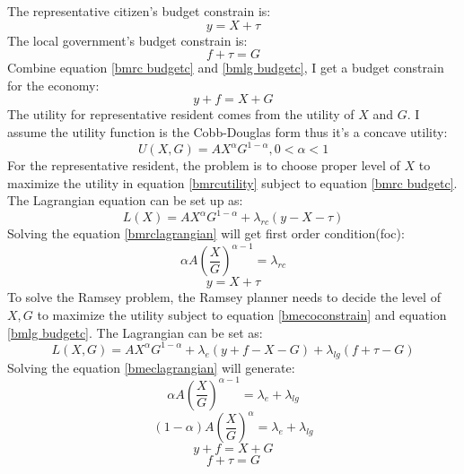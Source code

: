 The representative citizen's budget constrain is:
\begin{equation}
    y=X+\tau \label{bmrc budgetc}
\end{equation}
The local government's budget constrain is:
\begin{equation}
    f+\tau=G \label{bmlg budgetc}
\end{equation}
Combine equation \ref{bmrc budgetc} and \ref{bmlg budgetc}, I get a budget constrain for the economy:
\begin{equation}
    y+f=X+G \label{bmecoconstrain}
\end{equation}
The utility for representative resident comes from the utility of $X$ and $G$. I assume the utility function is the Cobb-Douglas form thus it's a concave utility:
\begin{equation}
    U(X,G)=AX^{\alpha}G^{1-\alpha} , 0<\alpha<1 \label{bmrcutility}
\end{equation}
For the representative resident, the problem is to choose proper level of $X$ to maximize the utility in equation \ref{bmrcutility} subject to equation \ref{bmrc budgetc}. The Lagrangian equation can be set up as:
\begin{equation}
    L(X)=AX^{\alpha}G^{1-\alpha}+\lambda_{rc}(y-X-\tau)  \label{bmrclagrangian}
\end{equation}
Solving the equation \ref{bmrclagrangian} will get first order condition(foc):
\begin{equation}
    \alpha A\left(\frac{X}{G}\right)^{\alpha-1}=\lambda_{r c} \label{lamdarc}
\end{equation}
\begin{equation}
    y=X+\tau \label{rcfoc}
\end{equation}
To solve the Ramsey problem, the Ramsey planner needs to decide the level of $X,G$ to maximize the utility subject to equation \ref{bmecoconstrain} and equation \ref{bmlg budgetc}. The Lagrangian can be set as:
\begin{equation}
    L(X,G)=AX^{\alpha}G^{1-\alpha}+\lambda_{e}(y+f-X-G)+\lambda_{lg}(f+\tau-G)  \label{bmeclagrangian}
\end{equation}
Solving the equation \ref{bmeclagrangian} will generate:
\begin{equation}
    \alpha A\left(\frac{X}{G}\right)^{\alpha-1}=\lambda_e+\lambda_{l g}
    \label{foc on X}
\end{equation}
\begin{equation}
    (1- \alpha) A\left(\frac{X}{G}\right)^{\alpha}=\lambda_e+\lambda_{l g} \label{foc on G}
\end{equation}
\begin{equation}
    y+f=X+G \label{foc on lambdae}
\end{equation}
\begin{equation}
    f+\tau=G \label{foc on lambdalg}
\end{equation}

